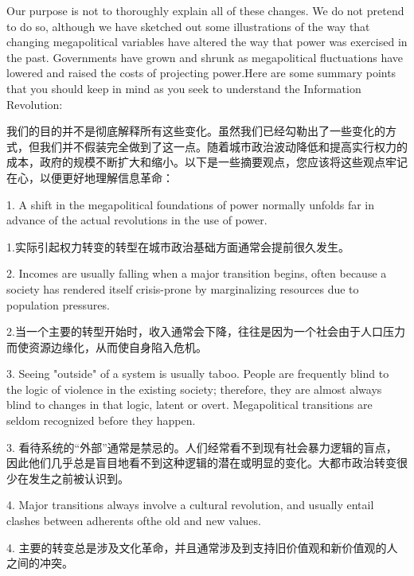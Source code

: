 \begin{Parallel}{97mm}{45mm}
  \ParallelLText
  {Our purpose is not to thoroughly explain all of these changes. We do not pretend to do so, although we have sketched out some illustrations of the way that changing megapolitical variables have altered the way that power was exercised in the past. Governments have grown and shrunk as megapolitical fluctuations have lowered and raised the costs of projecting power.Here are some summary points that you should keep in mind as you seek to understand the Information Revolution:}
  
  \ParallelRText
  {我们的目的并不是彻底解释所有这些变化。虽然我们已经勾勒出了一些变化的方式，但我们并不假装完全做到了这一点。随着城市政治波动降低和提高实行权力的成本，政府的规模不断扩大和缩小。以下是一些摘要观点，您应该将这些观点牢记在心，以便更好地理解信息革命：}
  \ParallelPar



  \ParallelLText
  {1. A shift in the megapolitical foundations of power normally unfolds far in advance of the actual revolutions in the use of power.}
  
  \ParallelRText
  {1.实际引起权力转变的转型在城市政治基础方面通常会提前很久发生。}
  \ParallelPar



  \ParallelLText
  {2. Incomes are usually falling when a major transition begins, often because a society has rendered itself crisis-prone by marginalizing resources due to population pressures.}
  
  \ParallelRText
  {2.当一个主要的转型开始时，收入通常会下降，往往是因为一个社会由于人口压力而使资源边缘化，从而使自身陷入危机。}
  \ParallelPar



  \ParallelLText
  {3. Seeing "outside" of a system is usually taboo. People are frequently blind to the logic of violence in the existing society; therefore, they are almost always blind to changes in that logic, latent or overt. Megapolitical transitions are seldom recognized before they happen.}
  
  \ParallelRText
  {3. 看待系统的“外部”通常是禁忌的。人们经常看不到现有社会暴力逻辑的盲点，因此他们几乎总是盲目地看不到这种逻辑的潜在或明显的变化。大都市政治转变很少在发生之前被认识到。}
  \ParallelPar



  \ParallelLText
  {4. Major transitions always involve a cultural revolution, and usually entail clashes between adherents ofthe old and new values.}
  
  \ParallelRText
  {4. 主要的转变总是涉及文化革命，并且通常涉及到支持旧价值观和新价值观的人之间的冲突。}
  \ParallelPar




\end{Parallel}
